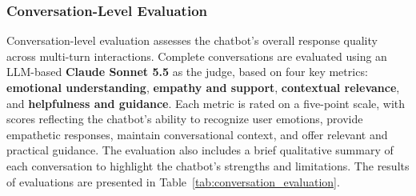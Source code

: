 \documentclass[conference]{IEEEtran}
\begin{document}
\subsubsection{Conversation-Level Evaluation}
Conversation-level evaluation assesses the chatbot's overall response quality across multi-turn interactions. Complete conversations are evaluated using an LLM-based \textbf{Claude Sonnet 5.5} \cite{claude_sonnet} as the judge, based on four key metrics: \textbf{emotional understanding}, \textbf{empathy and support}, \textbf{contextual relevance}, and \textbf{helpfulness and guidance}. Each metric is rated on a five-point scale, with scores reflecting the chatbot's ability to recognize user emotions, provide empathetic responses, maintain conversational context, and offer relevant and practical guidance. The evaluation also includes a brief qualitative summary of each conversation to highlight the chatbot's strengths and limitations.
The results of evaluations are presented in Table~\ref{tab:conversation_evaluation}.
\end{document}
